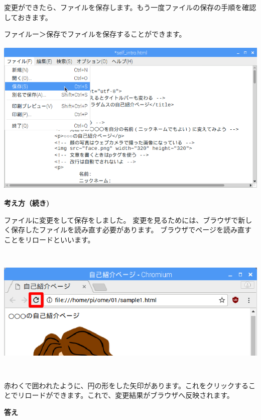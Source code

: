 \documentclass[a4paper,12pt]{jarticle}
\begin{document}
\bigskip

\flushleft
変更ができたら、ファイルを保存します。もう一度ファイルの保存の手順を確認しておきます。

ファイルー＞保存でファイルを保存することができます。



\centering
\includegraphics[width=13.624cm,height=7.512cm]{textbook-img147.png}



\clearpage
\flushleft
\textbf{考え方（続き)}




ファイルに変更をして保存をしました。
変更を見るためには、ブラウザで新しく保存したファイルを読み直す必要があります。
ブラウザでページを読み直すことをリロードといいます。


\bigskip


\bigskip
\centering
\includegraphics[width=13.665cm,height=6.287cm]{textbook-img149.png}

\flushleft
赤わくで囲われたように、円の形をした矢印があります。これをクリックすることでリロードができます。これで、変更結果がブラウザへ反映されます。

\vfill
\clearpage
\textbf{答え}
\end{document}
